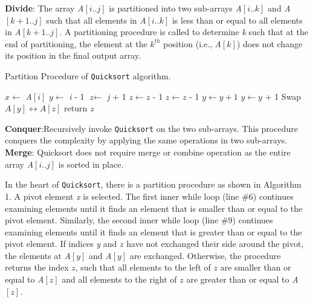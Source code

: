 \documentclass[a4paper, 10pt,twocolumn]{article}
\begin{document}
\textbf{Divide}: The array \textit{A$[i..j]$} is partitioned into two sub-arrays \textit{A$[i..k]$} and \textit{A$[k + 1..j]$} such that all elements in \textit{A$[i..k]$} is less than or equal to all elements in \textit{A$[k+1..j]$}. A partitioning procedure is called to determine \textit{k} such that at the end of partitioning, the element at the \textit{$k^{th}$} position (i.e., \textit{A$[k]$}) does not change its position in the final output array.\newpage
\begin{algorithm}
  \caption{Partition Procedure of \texttt{Quicksort} algorithm.}
  \label{algo:ins_sort1}
  \begin{algorithmic}[1]
     \newline
     \newline
      \State $x \leftarrow$ \textit{A$[i]$}
      \State $y \leftarrow$ \textit{i} - 1
      \State $\textit{z} \leftarrow$ \textit{j} + 1
          \State $z \leftarrow z$ - 1 
           \do \newline
            \State $z \leftarrow z$ - 1 
         \EndWhile
         \State $y \leftarrow y + 1$
          \do \newline
         \State $y \leftarrow y$ + 1 
         \EndWhile
            \State Swap $A[y] \leftrightarrow A[z]$
         \Else
            \State return \textit{z}
         \EndIf
      \EndWhile
   
     \EndProcedure 
  \end{algorithmic}
\end{algorithm}

\textbf{Conquer}:Recursively invoke \texttt{Quicksort} on the two sub-arrays. This procedure conquers the complexity by applying the same operations in two sub-arrays.\\
\textbf{Merge}: Quicksort does not require merge or combine operation as the entire array \textit{A$[i..j]$} is sorted in place.

In the heart of \texttt{Quicksort}, there is a partition procedure as shown in Algorithm 1. A pivot element \textit{x} is selected. The first inner while loop (line \#6) continues examining elements until it finds an element that is smaller than or equal to the pivot element. Similarly, the second inner while loop (line \#9) continues examining elements until it finds an element that is greater than or equal to the pivot element. If indices \textit{y} and $z$ have not exchanged their side around the pivot, the elements at \textit{A$[y]$} and \textit{A$[y]$} are exchanged. Otherwise, the procedure returns the index $z$, such that all elements to the left of $z$ are smaller than or equal to \textit{A$[z]$} and all elements to the right of $z$ are greater than or equal to \textit{A$[z]$}.
\end{document}
